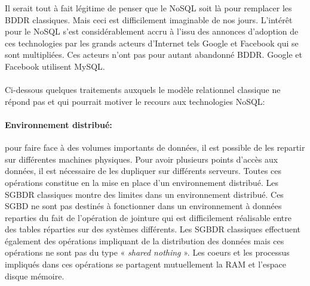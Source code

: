 Il serait tout à fait légitime de penser que le 
\textsf{NoSQL} soit là pour remplacer les \textsf{BDDR}
classiques. Mais ceci est difficilement imaginable de
nos jours. L’intérêt pour le \textsf{NoSQL} s'est considérablement
accru à l'issu des annonces d’adoption de ces technologies par les 
grands acteurs d'\textsf{Internet} tels 
\textsf{Google} et \textsf{Facebook} qui se sont multipliées. Ces acteurs
n'ont pas pour autant abandonné \textsf{BDDR}. \textsf{Google} et 
\textsf{Facebook} utilisent \textsf{MySQL}\cite{mysqlcustomers}.
\\
\\
Ci-dessous quelques traitements auxquels le modèle relationnel
classique ne répond pas et qui pourrait motiver le recours aux
technologies \textsf{NoSQL}:


\paragraph{Environnement distribué:} pour faire face à des volumes importants 
de données, il est possible de les repartir sur différentes machines physiques. 
Pour avoir plusieurs points d'accès aux données, il est nécessaire de les dupliquer
sur différents serveurs. Toutes ces opérations constitue en la mise en place d'un 
environnement distribué. Les \textsf{SGBDR} classiques montre des limites dans un 
environnement distribué. Ces {SGBD} ne sont pas destinés à fonctionner dans un
environnement à données reparties du fait de l'opération de jointure
qui est difficilement réalisable entre des tables réparties sur des systèmes différents\cite{RickCattell}.
Les \textsf{SGBDR} classiques effectuent également des opérations impliquant de la distribution des données
mais ces opérations ne sont pas du type « \textit{shared nothing} ». Les coeurs et les processus impliqués
dans ces opérations se partagent mutuellement la \textsf{RAM} et l'espace disque mémoire.

